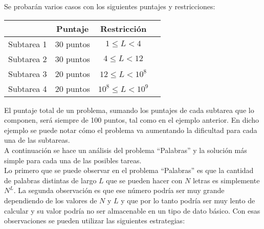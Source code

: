 \begin{ejemplo}
Se probarán varios casos con los siguientes puntajes y restricciones: 
\begin{center} 
\begin{tabular}{|r|c|c|c} \hline
&{\bf Puntaje} & {\bf Restricción} \\ \hline
Subtarea 1 &30 puntos & $1\leq L<4$ \\
Subtarea 2 &30 puntos & $4\leq L< 12$ \\
Subtarea 3 &20 puntos & $12\leq L<10^8$ \\
Subtarea 4 &20 puntos & $10^8\leq L<10^9$ \\ \hline
\end{tabular}
\end{center}
\end{ejemplo}\bigskip

El puntaje total de un problema, sumando los puntajes de cada subtarea que lo componen, será siempre de 100 puntos, tal como en el ejemplo anterior. En dicho ejemplo se puede notar cómo el problema va aumentando la dificultad
para cada una de las subtareas.\\


A continuación se hace un análisis del problema ``Palabras'' y la solución más
simple para cada una de las posibles tareas.\\

Lo primero que se puede observar en el problema ``Palabras'' es que la cantidad
de palabras distintas de largo $L$ que se pueden hacer con $N$ letras es
simplemente $N^L$.
La segunda observación es que ese número podría ser muy grande dependiendo de
los valores de $N$ y $L$ y que por lo tanto podría ser muy lento de calcular y 
su valor podría no ser almacenable en un tipo de dato básico.
Con esas observaciones se pueden utilizar las siguientes estrategias:

